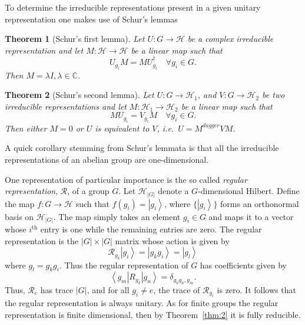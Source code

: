 \documentclass{article}
\newcommand{\ket}[1]{\left|#1\right\rangle}
\newcommand{\bra}[1]{\left\langle #1\right|}
\newcommand\defn[1]{\textsl{#1}}
\newcommand\cH{{\mathscr{H}}}
\newcommand\cR{{\mathcal R}}
\newtheorem{theorem}{Theorem}
\begin{document}
To determine the irreducible representations present in a given unitary representation one makes use of Schur's lemmas
\begin{theorem}[Schur's first lemma]
 Let $U:G\rightarrow\cH$ be a complex irreducible representation and let $M:\cH\rightarrow\cH$ be a linear map such that
\begin{equation}
 U_{g_i}M=MU_{g_i}^{\dagger}\quad \forall g_i\in G.
\label{29}
\end{equation}
Then $M=\lambda I, \lambda\in\mathbb{C}$.
\label{thm:3}
\end{theorem}
\begin{theorem}[Schur's second lemma]
 Let $U:G\rightarrow\cH_1$, and $V:G\rightarrow\cH_2$ be two irreducible representations and let $M:\cH_1\rightarrow\cH_2$ be a 
linear map such that
\begin{equation}
 MU_{g_i}=V_{g_i}M\quad \forall g_i\in G.
\label{30}
\end{equation}
Then either $M=0$ or $U$ is equivalent to $V$, i.e.~$U=M^{dagger}VM$.
\label{thm:4}
\end{theorem}
A quick corollary stemming from Schur's lemmata is that all the irreducible representations of an abelian group are one-dimensional.

One representation of particular importance is the so called \defn{regular representation}, $\cR$, of a group $G$.  Let $\cH_{\lvert G\rvert}$ denote a $G$-dimensional Hilbert.  Define the map $f:G\rightarrow\cH$ such that $f(g_i)=\ket{g_i}$, where $\{\ket{g_i}\}$ forms an orthonormal basis on $\cH_{\lvert G\rvert}$.  The map simply takes an element $g_i\in G$ and maps it to a vector whose $i^{\mathrm{th}}$ entry is one while the remaining entries are zero.  The regular representation is the $\lvert G\rvert\times\lvert G\rvert$ matrix whose action is given by 
\begin{equation}
 \cR_{g_k}\ket{g_i}=\ket{g_kg_i}=\ket{g_l}
\label{31}
\end{equation}
where $g_l=g_kg_i$.  Thus the regular representation of $G$ has coefficients given by 
\begin{equation}
 \bra{g_m}R_{g_k}\ket{g_n}=\delta_{g_kg_n,g_m}.
\label{32}
\end{equation}
Thus, $\cR_e$ has trace $\lvert G\rvert$, and for all $g_i\neq e$, the trace of $\cR_{g_i}$ is zero.  It follows that the regular representation is always unitary.  As for finite groups the regular representation is finite dimensional, then by Theorem~\ref{thm:2} it is fully reducible.     
 
\end{document}
